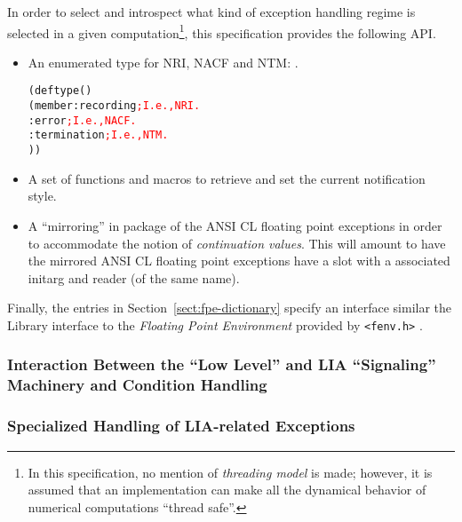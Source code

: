 \documentclass[../Description.tex]{subfiles}
\begin{document}
In order to select and introspect what kind of exception handling
regime is selected in a given computation\footnote{In this
  specification, no mention of \emph{threading model} is made;
  however, it is assumed that an implementation can make all the
  dynamical behavior of numerical computations ``thread safe''.}, this
specification provides the following API.
\begin{itemize}
\item An enumerated type for NRI, NACF and NTM: %
  .
  \begin{alltt}
    (deftype  ()
      (member :recording    \textcolor{red}{; I.e., NRI.}
              :error        \textcolor{red}{; I.e., NACF.}
              :termination  \textcolor{red}{; I.e., NTM.}
              ))
  \end{alltt}
\item A set of functions and macros to retrieve and set the current
  notification style.
\item A ``mirroring'' in package \CLLIAPKG{} of the ANSI CL floating
  point exceptions in order to accommodate the notion of
  \emph{continuation values}.  This will amount to have the mirrored
  ANSI CL floating point exceptions have a 
  slot with a associated initarg and reader (of the same name).
\end{itemize}

\vspace*{2mm}

\noindent
Finally, the entries in Section~\ref{sect:fpe-dictionary} specify an interface
similar the \CLang{} Library interface to the \emph{Floating Point
  Environment} provided by \verb|<fenv.h>| \cite{2018:C18}.


\subsubsection{Interaction Between the ``Low Level'' \IEEEFPStd{} and LIA
  ``Signaling'' Machinery and \CL{} Condition Handling}



\subsubsection{Specialized Handling of LIA-related Exceptions}


\end{document}
